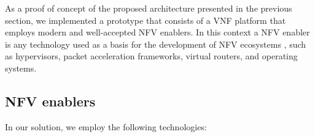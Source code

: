 

As a proof of concept of the proposed architecture presented in the previous section, we implemented a prototype that consists of a VNF platform that employs modern and well-accepted NFV enablers. In this context a NFV enabler is any technology used as a basis for the development of NFV ecosystems \cite{ETSI-2012}, such as hypervisors, packet acceleration frameworks, virtual routers, and operating systems.

\subsection{NFV enablers}

In our solution, we employ the following technologies:


